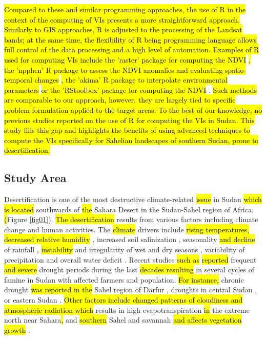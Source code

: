 \documentclass[jimaging,article,submit,pdftex,moreauthors]{Definitions/mdpi}
\begin{document}
\hl{Compared to these and similar programming approaches, the use of R in the context of the computing of VIs presents a more straightforward approach. Similarly to GIS approaches, R is adjusted to the processing of the Landsat bands; at the same time, the flexibility of R being programming language allows full control of the data processing and a high level of automation. Examples of R used for computing VIs include the 'raster' package for computing the NDVI }\cite{LEVEAU2021127199}\hl{, the 'npphen' R package to assess the NDVI anomalies and evaluating spatio-temporal changes} \cite{CHAVEZ2023103138}\hl{, the 'akima' R package to interpolate environmental parameters} \cite{KLIMAVICIUS2023171} \hl{or the 'RStoolbox' package for computing the NDVI} \cite{PRAVALIE2022108629}. \hl{Such methods are comparable to our approach, however, they are largely tied to specific problem formulation applied to the target areas. To the best of our knowledge, no previous studies reported on the use of R for computing the VIs in Sudan. This study fills this gap and highlights the benefits of using advanced techniques to compute the VIs specifically for Sahelian landscapes of southern Sudan, prone to desertification.}

\subsection{Study Area}

Desertification is one of the most destructive climate-related \hl{issue} in Sudan \hl{which is located }southwards of \hl{the }Sahara Desert in the Sudan-Sahel region of Africa, \hl{(}Figure \ref{fig01}). \hl{The desertification} results from various factors including climate change and human activities. The \hl{climate }drivers\hl{ }include \hl{rising temperatures, decreased relative humidity} \cite{Alvi}{, increased }soil salinization \cite{DAWELBAIT201245}, seasonality \hl{and decline }of rainfall \cite{MOHAMED20223265}, \hl{instability} and irregularity of wet and dry seasons \cite{HULME198689},\hl{ }variability of precipitation \cite{Elagib,Ayoub} and\hl{ }overall water deficit \cite{akhtar1994methods}. Recent studies \hl{such as} \cite{SALIH2017S31} \hl{reported} frequent \hl{and severe }drought periods during the last \hl{decades resulting} in several cycles of famine in Sudan with affected farmers and population. \hl{For instance, }chronic drought \hl{was reported in the} Sahel region of Darfur \cite{FULLER198739}, droughts in central Sudan \cite{Salih2022}, or eastern Sudan \cite{TARIKU2021144863,SULIEMAN2012132}. \hl{Other factors include changed patterns of cloudiness and atmospheric radiation which }results in high evapotranspiration \hl{in} the extreme north near Sahara\hl{, }and \hl{southern} Sahel and savannah \hl{and affects vegetation growth }\cite{ElKarouri1986}. 
\end{document}
